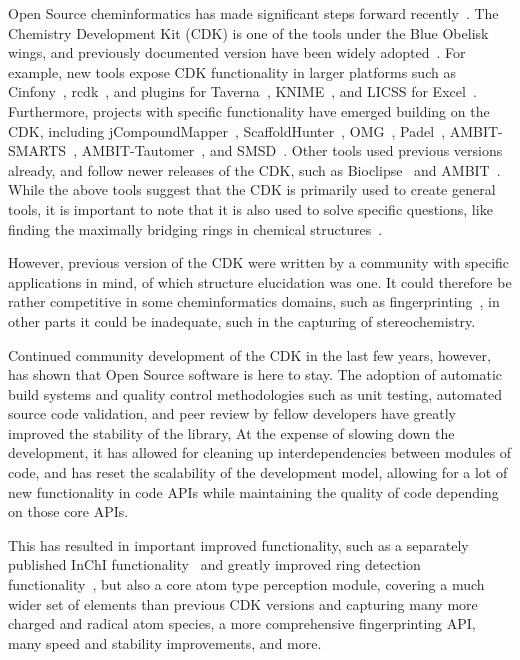 \documentclass[10pt]{bmcart}
\begin{document}
Open Source cheminformatics has made significant steps forward recently~\cite{OBoyle2011}.
The Chemistry Development Kit (CDK) is one of the tools under the Blue Obelisk wings,
and previously documented version have been widely adopted~\cite{Steinbeck2003,Steinbeck2006}.
For example, new tools expose CDK functionality in larger platforms such as Cinfony~\cite{OBoyle2008},
rcdk~\cite{Guha2007}, and plugins for Taverna~\cite{Truszkowski2011},
KNIME~\cite{Beisken2013}, and LICSS for Excel~\cite{Lawson2012}.
Furthermore, projects with specific functionality have emerged building on the CDK, including
jCompoundMapper~\cite{Hinselmann2011}, ScaffoldHunter~\cite{wetzel2009interactive}, OMG~\cite{Peironcely2012},
Padel~\cite{yap2011padel}, AMBIT-SMARTS~\cite{jeliazkova2011ambitsmarts}, AMBIT-Tautomer~\cite{kochev2013ambit},
and SMSD~\cite{Rahman2009,Rahman2014}. Other tools used previous versions already, and follow
newer releases of the CDK, such as Bioclipse~\cite{spjuth2007bioclipse,
spjuth2009bioclipse} and AMBIT~\cite{jeliazkova2011ambit}. While the above
tools suggest that the CDK is primarily used to create general tools, it is
important to note that it is also used to solve specific questions, like finding
the maximally bridging rings in chemical structures~\cite{Marth2015}.

However, previous version of the CDK were written by a community with specific applications
in mind, of which structure elucidation was one. It could therefore be rather competitive
in some cheminformatics domains, such as fingerprinting~\cite{Clark2014,Cannon2006}, in other parts
it could be inadequate, such in the capturing of stereochemistry.

Continued community development of the CDK in the last few years, however, has shown that
Open Source software is here to stay. The adoption of automatic build systems and
quality control methodologies such as unit testing, automated source code validation,
and peer review by fellow developers have greatly improved the stability of the library,
At the expense of slowing down the development, it has allowed for cleaning up interdependencies
between modules of code, and has reset the scalability of the development model,
allowing for a lot of new functionality in code APIs while maintaining the quality
of code depending on those core APIs.

This has resulted in important improved functionality, such as a separately published
InChI functionality~\cite{Spjuth2013} and greatly improved ring detection functionality~\cite{May2014},
but also a core atom type perception module, covering a much wider set of elements than
previous CDK versions and capturing many more charged and radical atom species,
a more comprehensive fingerprinting API, many speed and stability improvements, and more.
\end{document}
